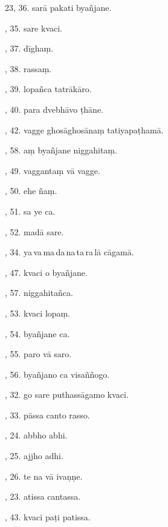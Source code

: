 23, 36. sarā pakati byañjane.\hfill \pageref{sut:23}\par {}, 35. sare kvaci.\hfill \pageref{sut:24}\par {}, 37. dīghaṃ.\hfill \pageref{sut:25}\par {}, 38. rassaṃ.\hfill \pageref{sut:26}\par {}, 39. lopañca tatrākāro.\hfill \pageref{sut:27}\par {}, 40. para dvebhāvo ṭhāne.\hfill \pageref{sut:28}\par {}, 42. vagge ghosāghosānaṃ tatiyapaṭhamā.\hfill \pageref{sut:29}\par {}, 58. aṃ byañjane niggahitaṃ.\hfill \pageref{sut:30}\par {}, 49. vaggantaṃ vā vagge.\hfill \pageref{sut:31}\par {}, 50. ehe ñaṃ.\hfill \pageref{sut:32}\par {}, 51. sa ye ca.\hfill \pageref{sut:33}\par {}, 52. madā sare.\hfill \pageref{sut:34}\par {}, 34. ya\,va\,ma\,da\,na\,ta\,ra\,lā cāgamā.\hfill \pageref{sut:35}\par {}, 47. kvaci o byañjane.\hfill \pageref{sut:36}\par {}, 57. niggahitañca.\hfill \pageref{sut:37}\par {}, 53. kvaci lopaṃ.\hfill \pageref{sut:38}\par {}, 54. byañjane ca.\hfill \pageref{sut:39}\par {}, 55. paro vā saro.\hfill \pageref{sut:40}\par {}, 56. byañjano ca visaññogo.\hfill \pageref{sut:41}\par {}, 32. go sare puthassāgamo kvaci.\hfill \pageref{sut:42}\par {}, 33. pāssa canto rasso.\hfill \pageref{sut:43}\par {}, 24. abbho abhi.\hfill \pageref{sut:44}\par {}, 25. ajjho adhi.\hfill \pageref{sut:45}\par {}, 26. te na vā ivaṇṇe.\hfill \pageref{sut:46}\par {}, 23. atissa cantassa.\hfill \pageref{sut:47}\par {}, 43. kvaci paṭi patissa.\hfill \pageref{sut:48}\par \noindent

